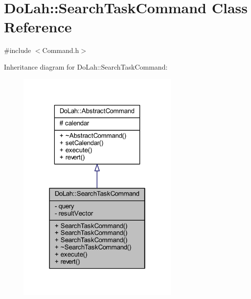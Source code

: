 \hypertarget{class_do_lah_1_1_search_task_command}{}\section{Do\+Lah\+:\+:Search\+Task\+Command Class Reference}
\label{class_do_lah_1_1_search_task_command}


{\ttfamily \#include $<$Command.\+h$>$}



Inheritance diagram for Do\+Lah\+:\+:Search\+Task\+Command\+:\nopagebreak
\begin{figure}[H]
\begin{center}
\leavevmode
\includegraphics[width=226pt]{class_do_lah_1_1_search_task_command__inherit__graph}
\end{center}
\end{figure}


